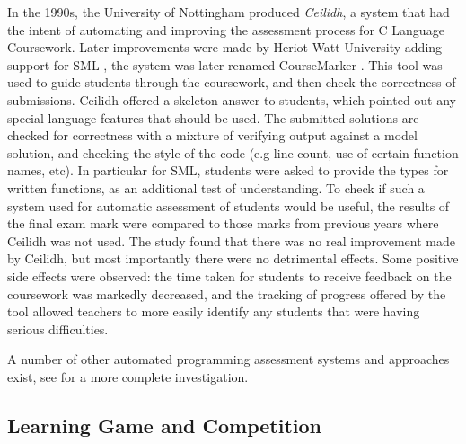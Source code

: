 \documentclass[sigplan,10pt,review]{acmart}\settopmatter{printfolios=true}
\begin{document}
In the 1990s, the University of Nottingham produced \emph{Ceilidh}, a
system that had the intent of automating and improving the assessment
process for C Language Coursework. Later improvements were made by
Heriot-Watt University adding support for \ac{SML}
\cite{foubister_automatic_1997}, the system was later renamed
CourseMarker \cite{higgins_coursemarker_2003}. This tool was used to
guide students through the coursework, and then check the correctness
of submissions. Ceilidh offered a skeleton answer to students, which
pointed out any special language features that should be used. The
submitted solutions are checked for correctness with a mixture of
verifying output against a model solution, and checking the style of
the code (e.g line count, use of certain function names, etc).  In
particular for \ac{SML}, students were asked to provide the types for
written functions, as an additional test of understanding.  To check
if such a system used for automatic assessment of students would be
useful, the results of the final exam mark were compared to those
marks from previous years where Ceilidh was not used. The study found
that there was no real improvement made by Ceilidh, but most
importantly there were no detrimental effects. Some positive side
effects were observed: the time taken for students to receive feedback
on the coursework was markedly decreased, and the tracking of progress
offered by the tool allowed teachers to more easily identify any
students that were having serious difficulties.

A number of other automated programming assessment systems and
approaches exist, see \cite{AlaMutka_CSE-2005-v15n2} for a more
complete investigation.

\subsection{Learning Game and Competition}
\end{document}
